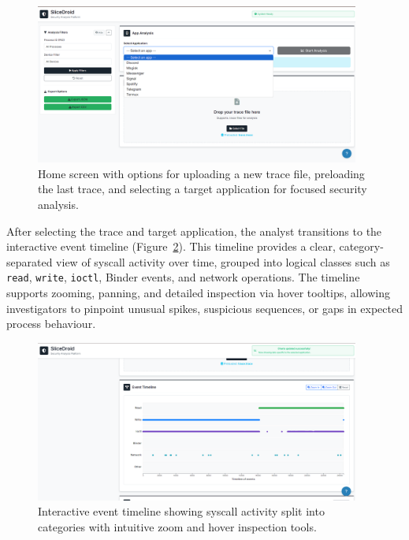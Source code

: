 \documentclass[a4paper,12pt]{report}
\begin{document}
\begin{figure}[H]
\centering
\includegraphics[width=0.95\textwidth]{home_screen.png}
\caption{Home screen with options for uploading a new trace file, preloading the last trace, and selecting a target application for focused security analysis.}
\label{fig:home_screen}
\end{figure}

After selecting the trace and target application, the analyst transitions to the interactive event timeline (Figure~\ref{fig:event_timeline}). This timeline provides a clear, category-separated view of syscall activity over time, grouped into logical classes such as \texttt{read}, \texttt{write}, \texttt{ioctl}, Binder events, and network operations. The timeline supports zooming, panning, and detailed inspection via hover tooltips, allowing investigators to pinpoint unusual spikes, suspicious sequences, or gaps in expected process behaviour.

\begin{figure}[H]
\centering
\includegraphics[width=0.95\textwidth]{system_events_timeline.png}
\caption{Interactive event timeline showing syscall activity split into categories with intuitive zoom and hover inspection tools.}
\label{fig:event_timeline}
\end{figure}
\end{document}
